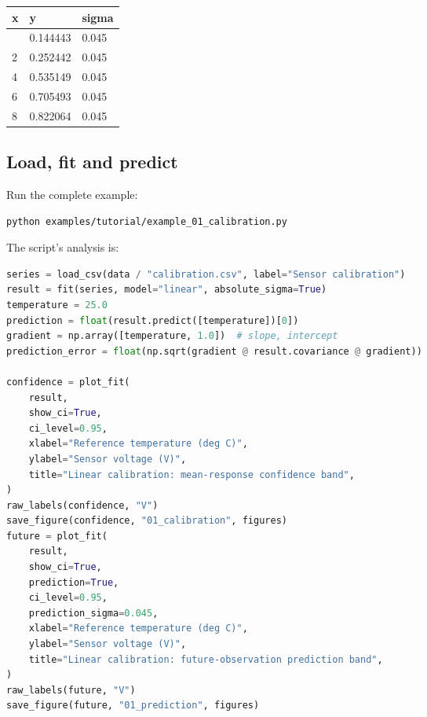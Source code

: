\documentclass[
  british,
  10pt,
  a4paper,
]{article}
\begin{document}
\begin{longtable}[]{@{}lll@{}}
\toprule\noalign{}
x & y & sigma \\
\midrule\noalign{}
\endhead
\bottomrule\noalign{}
\endlastfoot
0 & 0.144443 & 0.045 \\
2 & 0.252442 & 0.045 \\
4 & 0.535149 & 0.045 \\
6 & 0.705493 & 0.045 \\
8 & 0.822064 & 0.045 \\
\end{longtable}


\subsection{Load, fit and predict}\label{load-fit-and-predict}

Run the complete example:

\par\noindent\begin{minipage}{\linewidth}

\begin{lstlisting}[language=sh]
python examples/tutorial/example_01_calibration.py
\end{lstlisting}

\end{minipage}\par

The script's analysis is:

\par\noindent\begin{minipage}{\linewidth}

\begin{lstlisting}[language=Python]
series = load_csv(data / "calibration.csv", label="Sensor calibration")
result = fit(series, model="linear", absolute_sigma=True)
temperature = 25.0
prediction = float(result.predict([temperature])[0])
gradient = np.array([temperature, 1.0])  # slope, intercept
prediction_error = float(np.sqrt(gradient @ result.covariance @ gradient))

confidence = plot_fit(
    result,
    show_ci=True,
    ci_level=0.95,
    xlabel="Reference temperature (deg C)",
    ylabel="Sensor voltage (V)",
    title="Linear calibration: mean-response confidence band",
)
raw_labels(confidence, "V")
save_figure(confidence, "01_calibration", figures)
future = plot_fit(
    result,
    show_ci=True,
    prediction=True,
    ci_level=0.95,
    prediction_sigma=0.045,
    xlabel="Reference temperature (deg C)",
    ylabel="Sensor voltage (V)",
    title="Linear calibration: future-observation prediction band",
)
raw_labels(future, "V")
save_figure(future, "01_prediction", figures)
\end{lstlisting}

\end{minipage}\par
\end{document}

